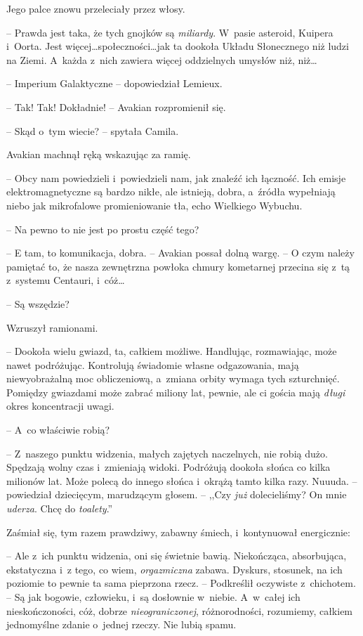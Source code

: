 \documentclass[oneside,polish,12pt,sfheadings]{mwbk}
\begin{document}
Jego palce znowu przeleciały przez włosy.

-- Prawda jest taka, że tych gnojków są \emph{miliardy}. W~pasie asteroid,
Kuipera i~Oorta. Jest więcej\ldots społeczności\ldots jak ta dookoła Układu
Słonecznego niż ludzi na Ziemi. A~każda z~nich zawiera więcej
oddzielnych umysłów niż, niż\ldots

-- Imperium Galaktyczne -- dopowiedział Lemieux.

-- Tak! Tak! Dokładnie! -- Avakian rozpromienił się.

-- Skąd o~tym wiecie? -- spytała Camila.

Avakian machnął ręką wskazując za ramię.

-- Obcy nam powiedzieli i~powiedzieli nam, jak znaleźć ich łączność. Ich
emisje elektromagnetyczne są bardzo nikłe, ale istnieją, dobra, a~źródła
wypełniają niebo jak mikrofalowe promieniowanie tła, echo Wielkiego
Wybuchu.

-- Na pewno to nie jest po prostu część tego?

-- E tam, to komunikacja, dobra. -- Avakian possał dolną wargę. -- O czym
należy pamiętać to, że nasza zewnętrzna powłoka chmury kometarnej
przecina się z~tą z~systemu Centauri, i~cóż\ldots

-- Są wszędzie?

Wzruszył ramionami. 

-- Dookoła wielu gwiazd, ta, całkiem możliwe.
Handlując, rozmawiając, może nawet podróżując. Kontrolują świadomie
własne odgazowania, mają niewyobrażalną moc obliczeniową, a~zmiana orbity
wymaga tych szturchnięć. Pomiędzy gwiazdami może zabrać miliony lat,
pewnie, ale ci gościa mają \emph{długi} okres koncentracji uwagi.

-- A~co właściwie robią?

-- Z~naszego punktu widzenia, małych zajętych naczelnych, nie robią dużo.
Spędzają wolny czas i~zmieniają widoki. Podróżują dookoła słońca co
kilka milionów lat. Może polecą do innego słońca i~okrążą tamto kilka
razy. Nuuuda. -- powiedział dziecięcym, marudzącym głosem. -- ,,Czy
\emph{już} dolecieliśmy? On mnie \emph{uderza}. Chcę do \emph{toalety}.''

Zaśmiał się, tym razem prawdziwy, zabawny śmiech, i~kontynuował
energicznie: 

-- Ale z~ich punktu widzenia, oni się świetnie bawią.
Niekończąca, absorbująca, ekstatyczna i~z tego, co wiem,
\emph{orgazmiczna} zabawa. Dyskurs, stosunek, na ich poziomie to pewnie
ta sama pieprzona rzecz. -- Podkreślił oczywiste z~chichotem. -- Są jak
bogowie, człowieku, i~są dosłownie w~niebie. A~w~całej ich
nieskończoności, cóż, dobrze \emph{nieograniczonej}, różnorodności,
rozumiemy, całkiem jednomyślne zdanie o~jednej rzeczy. Nie lubią spamu.
\end{document}
